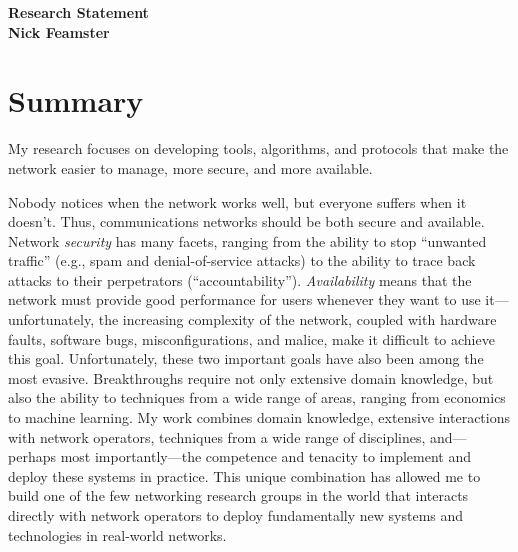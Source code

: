 \newpage \setcounter{page}{1}

\begin{center}
{\Large\textbf{Research Statement}}\\[0.1in] {\large\textbf{Nick
Feamster}}\\
\end{center}


\section*{Summary}

My research focuses on developing tools, algorithms, and protocols that
make the network easier to manage, more secure, and more available.

Nobody notices when the network works well, but everyone suffers when it
doesn't.  Thus, communications networks should be both secure and
available.  Network {\em security} has many facets, ranging from the
ability to stop ``unwanted traffic'' (e.g., spam and denial-of-service
attacks) to the ability to trace back attacks to their perpetrators
(``accountability'').  {\em Availability} means that the network must
provide good performance for users whenever they want to use
it---unfortunately, the increasing complexity of the network, coupled
with hardware faults, software bugs, misconfigurations, and malice, make
it difficult to achieve this goal.  Unfortunately, these two important
goals have also been among the most evasive.  Breakthroughs require not
only extensive domain knowledge, but also the ability to techniques from
a wide range of areas, ranging from economics to machine learning.  My
work combines domain knowledge, extensive interactions with network
operators, techniques from a wide range of disciplines, and---perhaps
most importantly---the competence and tenacity to implement and deploy
these systems in practice.  This unique combination has allowed me to
build one of the few networking research groups in the world that
interacts directly with network operators to deploy fundamentally new
systems and technologies in real-world networks.

